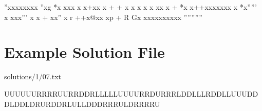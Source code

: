 \begin{DoxyVerb}''xxxxxxxx
''xg    *x
xxx x x+xx
x    + + x
x x x x xx
x    +  *x
x++xxxxxxx
x  *x'''''
x   xxx'''
x x + xx''
x r ++x@xx
xp  + R Gx
xxxxxxxxxx
''''''''''\end{DoxyVerb}
\hypertarget{viewsolution_page_example_solution_file_sec}{}\section{Example Solution File}\label{viewsolution_page_example_solution_file_sec}
solutions/1/07.\+txt

\begin{DoxyVerb}UUUUUURRRRUURRDDRLLLLLUUUURRDURRRLDDLLLRDDLLUUUDDDLDDLDRURDDRLULLDDDRRRULDRRRRU\end{DoxyVerb}
 